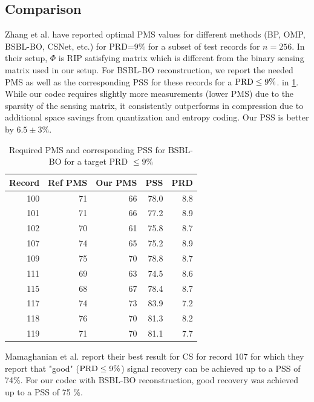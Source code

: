 \subsection{Comparison}
Zhang et al. \cite{zhang2021csnet} have reported
optimal PMS values for different methods (BP, OMP, BSBL-BO, CSNet, etc.)
for PRD=9\% for a subset of test records for $n=256$.
In their setup, $\Phi$ is RIP satisfying matrix which is different
from the binary sensing matrix used in our setup.
For BSBL-BO reconstruction,
we report the needed PMS as well as the corresponding PSS
for these records for a $\mathrm{PRD} \leq 9 \%$.
in \cref{tbl-bsbl-optimal-pss-prd}.
While our codec requires slightly more measurements (lower PMS)
due to the sparsity of the sensing matrix, it consistently
outperforms in compression due to additional space
savings from quantization and entropy coding.
Our PSS is better by $6.5 \pm 3\%$. 

\begin{table}[ht]
\centering
\caption{Required PMS and corresponding PSS for BSBL-BO for
a target PRD $\leq 9\%$}
\begin{tabular}{rrrrr}
\toprule
 Record &  Ref PMS &  Our PMS &  PSS &  PRD \\
\midrule
100 &         71 &   66 & 78.0 &  8.8 \\
101 &         71 &   66 & 77.2 &  8.9 \\
102 &         70 &   61 & 75.8 &  8.7 \\
107 &         74 &   65 & 75.2 &  8.9 \\
109 &         75 &   70 & 78.8 &  8.7 \\
111 &         69 &   63 & 74.5 &  8.6 \\
115 &         68 &   67 & 78.4 &  8.7 \\
117 &         74 &   73 & 83.9 &  7.2 \\
118 &         76 &   70 & 81.3 &  8.2 \\
119 &         71 &   70 & 81.1 &  7.7 \\
\bottomrule
\end{tabular}
\label{tbl-bsbl-optimal-pss-prd}
\end{table}


Mamaghanian et al. \cite{mamaghanian2011compressed}
report their best result for CS for record 107
for which they report that "good" ($\mathrm{PRD} \leq 9\%$)
signal recovery can be achieved up to a PSS of 74\%.
For our codec with BSBL-BO reconstruction, good
recovery was achieved up to a PSS of 75 \%.

